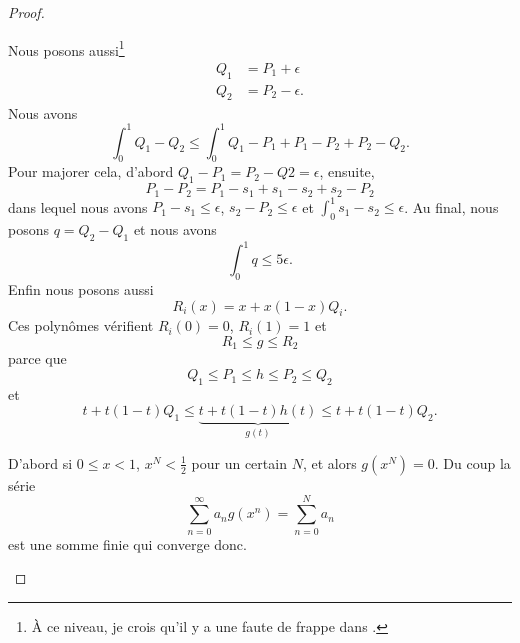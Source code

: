 \begin{proof}
\begin{subproof}
		Nous posons aussi\footnote{À ce niveau, je crois qu'il y a une faute de frappe dans \cite{ytMOpe}.}
		\begin{subequations}
			\begin{align}
				Q_1 & =P_1+\epsilon  \\
				Q_2 & =P_2-\epsilon.
			\end{align}
		\end{subequations}
		Nous avons
		\begin{equation}
			\int_0^1Q_1-Q_2\leq\int_0^1 Q_1-P_1+P_1-P_2+P_2-Q_2.
		\end{equation}
		Pour majorer cela, d'abord \( Q_1-P_1=P_2-Q2=\epsilon\), ensuite,
		\begin{equation}
			P_1-P_2=P_1-s_1+s_1-s_2+s_2-P_2
		\end{equation}
		dans lequel nous avons \( P_1-s_1\leq \epsilon\), \( s_2-P_2\leq \epsilon\) et \( \int_0^1s_1-s_2\leq\epsilon\). Au final, nous posons \( q=Q_2-Q_1\) et nous avons
		\begin{equation}
			\int_0^1q\leq 5\epsilon.
		\end{equation}
		Enfin nous posons aussi
		\begin{equation}
			R_i(x)=x+x(1-x)Q_i.
		\end{equation}
		Ces polynômes vérifient \( R_i(0)=0\), \( R_i(1)=1\) et
		\begin{equation}
			R_1\leq g\leq R_2
		\end{equation}
		parce que
		\begin{equation}
			Q_1\leq P_1\leq h\leq  P_2\leq Q_2
		\end{equation}
		et
		\begin{equation}
			t+t(1-t)Q_1\leq \underbrace{t+t(1-t)h(t)}_{g(t)}\leq t+t(1-t)Q_2.
		\end{equation}

		D'abord si \( 0\leq x<1\), \( x^N<\frac{ 1 }{2}\) pour un certain \( N\), et alors \( g(x^N)=0\). Du coup la série
		\begin{equation}
			\sum_{n=0}^{\infty}a_ng(x^n)=\sum_{n=0}^{N}a_n
		\end{equation}
		est une somme finie qui converge donc.


\end{subproof}
\end{proof}
